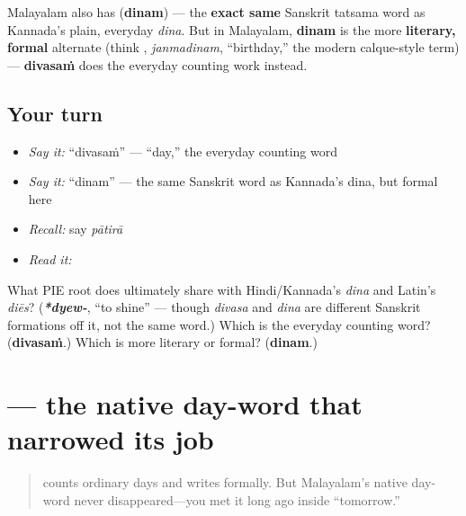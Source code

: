 \begin{cousinweb}
Malayalam also has \textbf{} (\textbf{dinam}) — the \textbf{exact same} Sanskrit tatsama word as Kannada's plain, everyday \emph{dina}. But in Malayalam, \textbf{dinam} is the more \textbf{literary, formal} alternate (think \textbf{}, \emph{janmadinam}, \textquotedblleft{}birthday,\textquotedblright{} the modern calque-style term) — \textbf{divasaṁ} does the everyday counting work instead.
\end{cousinweb}

\subsection*{Your turn}
\begin{itemize}
\raggedright
  \item \emph{Say it:} \textquotedblleft{}divasaṁ\textquotedblright{} — \textquotedblleft{}day,\textquotedblright{} the everyday counting word
  \item \emph{Say it:} \textquotedblleft{}dinam\textquotedblright{} — the same Sanskrit word as Kannada's dina, but formal here
  \item \emph{Recall:} say \emph{pātirā}
  \item \emph{Read it:} \textbf{}
\end{itemize}

\begin{tcolorbox}[breakable,colback=teal!4,colframe=teal!35!black,title={Before you move on}]
What PIE root does \textbf{} ultimately share with Hindi/Kannada's \emph{dina} and Latin's \emph{diēs}? (\emph{\textbf{*dyew-}}, \textquotedblleft{}to shine\textquotedblright{} — though \emph{divasa} and \emph{dina} are different Sanskrit formations off it, not the same word.) Which is the everyday counting word? (\textbf{divasaṁ}.) Which is more literary or formal? (\textbf{dinam}.)
\end{tcolorbox}
\section[\texorpdfstring{\ml{നാൾ} (nāḷ)}{നാൾ (nāḷ)}]{ — the native day-word that narrowed its job}

\label{lesson:ML-C23-naal}



\begin{quote}
\textbf{} counts ordinary days and \textbf{} writes formally. But Malayalam’s native day-word never disappeared—you met it long ago inside “tomorrow.”
\end{quote}

